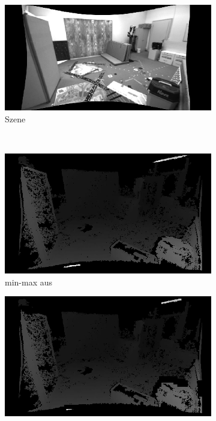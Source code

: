 \documentclass[12pt,titlepage, a4paper]{article}
\begin{document}
\begin{figure}[h!]
	\centering
	\begin{subfigure}[h]{0.45\textwidth}
		\includegraphics[width=\textwidth]{./jumpEdge/camera.png}
		\caption{Szene}
	\end{subfigure}\\
	\begin{subfigure}[h]{0.45\textwidth}
		\includegraphics[width=\textwidth]{./jumpEdge/je_off_disparity.png}
		\caption{min-max aus}
	\end{subfigure}
	\begin{subfigure}[h]{0.45\textwidth}
		\includegraphics[width=\textwidth]{./jumpEdge/je_on_disparity.png}

\end{subfigure}
\end{figure}
\end{document}
